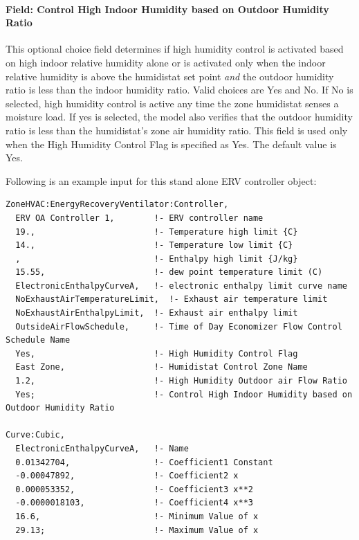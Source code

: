 \paragraph{Field: Control High Indoor Humidity based on Outdoor Humidity Ratio}\label{field-control-high-indoor-humidity-based-on-outdoor-humidity-ratio-1}

This optional choice field determines if high humidity control is activated based on high indoor relative humidity alone or is activated only when the indoor relative humidity is above the humidistat set point \emph{and} the outdoor humidity ratio is less than the indoor humidity ratio. Valid choices are Yes and No. If No is selected, high humidity control is active any time the zone humidistat senses a moisture load. If yes is selected, the model also verifies that the outdoor humidity ratio is less than the humidistat's zone air humidity ratio. This field is used only when the High Humidity Control Flag is specified as Yes. The default value is Yes.

Following is an example input for this stand alone ERV controller object:

\begin{lstlisting}
ZoneHVAC:EnergyRecoveryVentilator:Controller,
  ERV OA Controller 1,        !- ERV controller name
  19.,                        !- Temperature high limit {C}
  14.,                        !- Temperature low limit {C}
  ,                           !- Enthalpy high limit {J/kg}
  15.55,                      !- dew point temperature limit (C)
  ElectronicEnthalpyCurveA,   !- electronic enthalpy limit curve name
  NoExhaustAirTemperatureLimit,  !- Exhaust air temperature limit
  NoExhaustAirEnthalpyLimit,  !- Exhaust air enthalpy limit
  OutsideAirFlowSchedule,     !- Time of Day Economizer Flow Control Schedule Name
  Yes,                        !- High Humidity Control Flag
  East Zone,                  !- Humidistat Control Zone Name
  1.2,                        !- High Humidity Outdoor air Flow Ratio
  Yes;                        !- Control High Indoor Humidity based on Outdoor Humidity Ratio

Curve:Cubic,
  ElectronicEnthalpyCurveA,   !- Name
  0.01342704,                 !- Coefficient1 Constant
  -0.00047892,                !- Coefficient2 x
  0.000053352,                !- Coefficient3 x**2
  -0.0000018103,              !- Coefficient4 x**3
  16.6,                       !- Minimum Value of x
  29.13;                      !- Maximum Value of x
\end{lstlisting}
